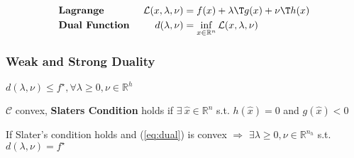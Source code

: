 $$\begin{aligned}
		                           & \textbf{Lagrange }                                              &
		\mathcal{L}(x,\lambda,\nu) & = f(x) + \lambda\T g(x)+\nu\T h(x)
		\\
		                           & \textbf{Dual Function }                                         &
		d(\lambda,\nu)             & = \inf_{x \in \mathcal{\mathbb{R}}^n}\mathcal{L}(x,\lambda,\nu)
	\end{aligned}$$




\subsubsection{Weak and Strong Duality}

\begin{proposition}
	$d(\lambda,\nu)\le f^\star,\forall\lambda\ge0,\nu\in\mathbb{R}^{h}$
\end{proposition}

\begin{definition}
	$\mathcal{C}$ convex, \textbf{Slaters Condition} holds if
	$\exists\ \hat{x} \in \mathbb{R}^{n}$ s.t. $h(\hat{x})=0$ and $g(\hat{x})<0$
\end{definition}

\begin{proposition}
	If Slater's condition holds
	and (\ref{eq:dual}) is convex
	$\Rightarrow$
	$\exists \lambda \ge 0, \nu \in \mathbb{R}^{n_h}$ s.t. $d(\lambda,\nu)=f^\star$
\end{proposition}



